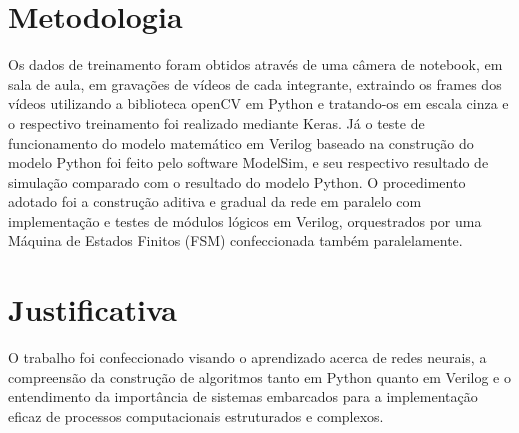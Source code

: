 \section{Metodologia}
Os dados de treinamento foram obtidos através de uma câmera de notebook, em sala de aula, em gravações de vídeos de cada integrante, extraindo os frames dos vídeos utilizando a biblioteca openCV em Python e tratando-os em escala cinza e o respectivo treinamento foi realizado mediante Keras. Já o teste de funcionamento do modelo matemático em Verilog baseado na construção do modelo Python foi feito pelo software ModelSim, e seu respectivo resultado de simulação comparado com o resultado do modelo Python.
O procedimento adotado foi a construção aditiva e gradual da rede em paralelo com implementação e testes de módulos lógicos em Verilog, orquestrados por uma Máquina de Estados Finitos (FSM) confeccionada também paralelamente.

\section{Justificativa}
O trabalho foi confeccionado visando o aprendizado acerca de redes neurais, a compreensão da construção de algoritmos tanto em Python quanto em Verilog e o entendimento da importância de sistemas embarcados para a implementação eficaz de processos computacionais estruturados e complexos.
\nocite{Hoxha:2025:FAN}
\nocite{MADAOUI2023104927}